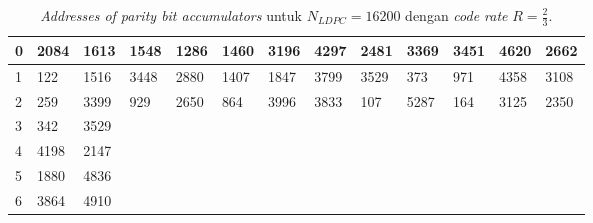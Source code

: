 \begin{table}[tb]
	\centering
	\caption{\textit{Addresses of parity bit accumulators} untuk $N_{LDPC}=16200$ dengan \textit{code rate} $R=\frac{2}{3}$.}
	\label{table:rate2}
	\begin{tabular}{|l|l|l|llllllllll}
		\hline
		0  & 2084 & 1613 & \multicolumn{1}{l|}{1548} & \multicolumn{1}{l|}{1286} & \multicolumn{1}{l|}{1460} & \multicolumn{1}{l|}{3196} & \multicolumn{1}{l|}{4297} & \multicolumn{1}{l|}{2481} & \multicolumn{1}{l|}{3369} & \multicolumn{1}{l|}{3451} & \multicolumn{1}{l|}{4620} & \multicolumn{1}{l|}{2662} \\ \hline
		1  & 122  & 1516 & \multicolumn{1}{l|}{3448} & \multicolumn{1}{l|}{2880} & \multicolumn{1}{l|}{1407} & \multicolumn{1}{l|}{1847} & \multicolumn{1}{l|}{3799} & \multicolumn{1}{l|}{3529} & \multicolumn{1}{l|}{373}  & \multicolumn{1}{l|}{971}  & \multicolumn{1}{l|}{4358} & \multicolumn{1}{l|}{3108} \\ \hline
		2  & 259  & 3399 & \multicolumn{1}{l|}{929}  & \multicolumn{1}{l|}{2650} & \multicolumn{1}{l|}{864}  & \multicolumn{1}{l|}{3996} & \multicolumn{1}{l|}{3833} & \multicolumn{1}{l|}{107}  & \multicolumn{1}{l|}{5287} & \multicolumn{1}{l|}{164}  & \multicolumn{1}{l|}{3125} & \multicolumn{1}{l|}{2350} \\ \hline
		3  & 342  & 3529 &                           &                           &                           &                           &                           &                           &                           &                           &                           &                           \\ \cline{1-3}
		4  & 4198 & 2147 &                           &                           &                           &                           &                           &                           &                           &                           &                           &                           \\ \cline{1-3}
		5  & 1880 & 4836 &                           &                           &                           &                           &                           &                           &                           &                           &                           &                           \\ \cline{1-3}
		6  & 3864 & 4910 &                           &                           &                           &                           &                           &                           &                           &                           &                           &                           \\ \cline{1-3}

\end{tabular}
\end{table}
